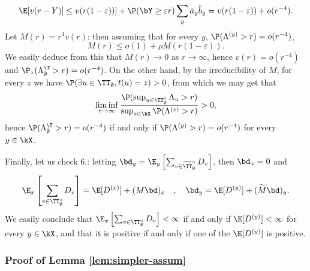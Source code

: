 \documentclass[10pt,a4paper]{article}
\newcommand{\wM}{\widetilde{M}}
\begin{document}
\[ \E[v(r-Y)] \leq v(r(1-\varepsilon))] + \P(\bY\geq \varepsilon r) \sum_y \tilde a_y \tilde b_y = v(r(1-\varepsilon)) + o(r^{-4}) . \]
Let $M(r) = r^4 v(r)$: then assuming that for every $y$, $\P(\Lambda^{(y)}>r) = o(r^{-4})$,
\[ M(r) \leq o(1) + \rho M(r(1-\varepsilon)) . \]
We easily deduce from this that $M(r)\to 0$ as $r\to\infty$, hence $v(r) = o(r^{-4})$ and $\P_x(\Lambda^\T_\emptyset > r) = o(r^{-4})$. 
On the other hand, by the irreducibility of $M$, for every $z$ we have $\P(\exists u\in \TT_\emptyset, t(u) = z)>0$, from which we may get that 
\[ \liminf_{r\to\infty} \frac{\P(\sup_{u\in\TT_\emptyset^\circ} \Lambda_u>r)}{\sup_{z\in\kX} \P(\Lambda^{(z)}>r)} > 0 , \]
hence $\P(\Lambda^\T_\emptyset >r)=o(r^{-4})$ if and only if $\P(\Lambda^{(y)}>r)=o(r^{-4})$ for every $y\in\kX$.  



Finally, let us check 6.: letting $\bd_y = \E_y\left[\sum_{v\in\widetilde\TT^\circ_\emptyset} D_v\right]$, then $\bd_x = 0$ and 
\[ \E_x\left[\sum_{v\in\TT^\circ_\emptyset} D_v\right] = \E[D^{(x)}] + (M\bd)_x 
\quad , \quad 
\bd_y = \E[D^{(y)}] + (\wM \bd)_y .
\]
We easily conclude that $\E_x\left[\sum_{v\in\TT^\circ_\emptyset} D_v\right]<\infty$ if and only if $\E[D^{(y)}]<\infty$ for every $y\in\kX$, and that it is positive if and only if one of the $\E[D^{(y)}]$ is positive. 




\subsubsection{Proof of Lemma \ref{lem:simpler-assum}}
\end{document}
